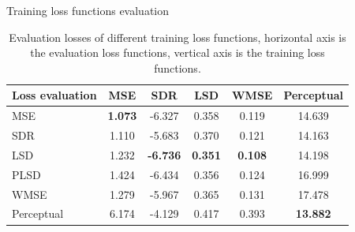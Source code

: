 \documentclass{beamer}
\begin{document}


\begin{frame}{Training loss functions evaluation}
    \vspace{-1.5\baselineskip}
    \begin{table}
        \centering
        \caption{Evaluation losses of different training loss functions, horizontal axis is the evaluation loss functions, vertical axis is the training loss functions.}
        \label{Evaluation losses of the training loss functions comparison}
        \begin{tabular}{l|c|c|c|c|c}
            \hline
            Loss evaluation & MSE & SDR & LSD & WMSE & Perceptual \\
            \hline
            MSE & \textbf{1.073} & -6.327 & 0.358 & 0.119 & 14.639 \\
            \hline
            SDR & 1.110 & -5.683 & 0.370 & 0.121 & 14.163 \\
            \hline
            LSD & 1.232 & \textbf{-6.736} & \textbf{0.351} & \textbf{0.108} & 14.198 \\
            \hline
            PLSD & 1.424 & -6.434 & 0.356 & 0.124 & 16.999 \\
            \hline
            WMSE & 1.279 & -5.967 & 0.365 & 0.131 & 17.478 \\
            \hline
            Perceptual & 6.174 & -4.129 & 0.417 & 0.393 & \textbf{13.882} \\
            \hline
        \end{tabular}
    \end{table}
\end{frame}
\end{document}
